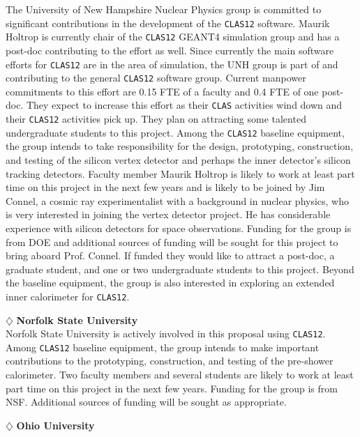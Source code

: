 \noindent
The University of New Hampshire Nuclear Physics group is committed to 
significant contributions in the development of the {\tt CLAS12} software. 
Maurik Holtrop is currently chair of the {\tt CLAS12} GEANT4 simulation 
group and has a post-doc contributing to the effort as well.  Since currently 
the main software efforts for {\tt CLAS12} are in the area of simulation, the
UNH group is part of and contributing to the general {\tt CLAS12} software 
group.  Current manpower commitments to this effort are 0.15 FTE of a faculty 
and 0.4 FTE of one post-doc.  They expect to increase this effort as their
{\tt CLAS} activities wind down and their {\tt CLAS12} activities pick up.
They plan on attracting some talented undergraduate students to this project.
Among the {\tt CLAS12} baseline equipment, the group intends to take 
responsibility for the design, prototyping, construction, and testing of the 
silicon vertex detector and perhaps the inner detector's silicon tracking 
detectors.  Faculty member Maurik Holtrop is likely to work at least part 
time on this project in the next few years and is likely to be joined by 
Jim Connel, a cosmic ray experimentalist with a background in nuclear 
physics, who is very interested in joining the vertex detector project. He 
has considerable experience with silicon detectors for space observations. 
Funding for the group is from DOE and additional sources of funding will be 
sought for this project to bring aboard Prof. Connel.  If funded they would
like to attract a post-doc, a graduate student, and one or two undergraduate 
students to this project.  Beyond the baseline equipment, the group is also 
interested in exploring an extended inner calorimeter for {\tt CLAS12}.

\vskip 0.4cm

\noindent
$\diamondsuit$ {\bf Norfolk State University} \\[0.2ex]

\noindent
Norfolk State University is actively involved in this proposal using 
{\tt CLAS12}.  Among {\tt CLAS12} baseline equipment, the group intends to 
make important contributions to the prototyping, construction, and testing 
of the pre-shower calorimeter.  Two faculty members and several students are 
likely to work at least part time on this project in the next few years.  
Funding for the group is from NSF.  Additional sources of funding will be 
sought as appropriate. 

\vskip 0.4cm

\noindent
$\diamondsuit$ {\bf Ohio University} \\[0.2ex]

